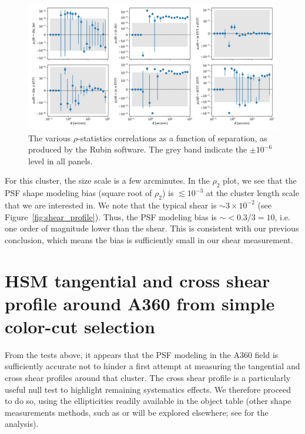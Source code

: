 \documentclass[SE,lsstdraft,authoryear,toc]{lsstdoc}
\begin{document}
\begin{figure}
\centering
\includegraphics[width=\textwidth]{Figures/rho_stat.png}
\caption{The various $\rho$-statistics correlations as a function of separation, as produced by the Rubin  software. The grey band indicate the $\pm 10^{-6}$ level in all panels.\label{fig:rho_stat}}
\end{figure}


For this cluster, the size scale is a few arcminutes. In the $\rho_2$ plot, we see that the PSF shape modeling bias (square root of $\rho_2$) is $\lesssim 10^{-3}$ at the cluster length scale that we are interested in. We note that the typical shear is $\sim 3\times10^{-2}$ (see Figure~\ref{fig:shear_profile}). Thus, the PSF modeling bias is $\sim <0.3/3=10$, i.e. one order of magnitude lower than the shear. This is consistent with our previous conclusion, which means the bias is sufficiently small in our shear measurement.


\section{HSM tangential and cross shear profile around A360 from simple color-cut selection}
\label{sec:shear_profile}

From the tests above, it appears that the PSF modeling in the A360 field is sufficiently accurate not to hinder a first attempt at measuring the tangential and cross shear profiles around that cluster. The cross shear profile is a particularly useful null test to highlight remaining systematics effects. We therefore proceed to do so, using the  ellipticities readily available in the object table (other shape measurements methods, such as  or  will be explored elsewhere; see  for the  analysis). 
\end{document}
